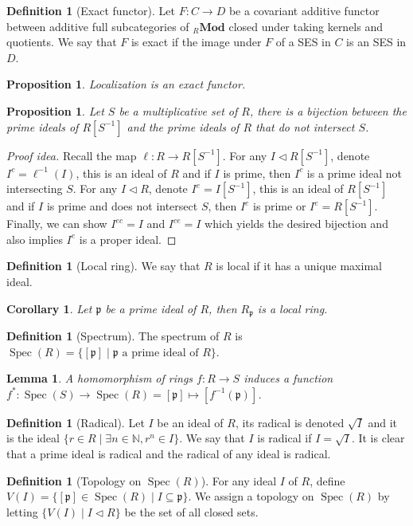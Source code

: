 \documentclass[paper=a4, fontsize=12pt]{scrartcl} %
\newtheorem{cor}[thm]{Corollary}
\newtheorem{prop}[thm]{Proposition}
\newtheorem{lem}[thm]{Lemma}
\theoremstyle{definition}
\newtheorem{defn}[thm]{Definition}
\theoremstyle{remark}
\newcommand{\N}{\mathbb{N}}
\newcommand{\lp}{{\mathfrak{p}}}
\DeclareMathOperator{\spec}{Spec}
\begin{document}
\begin{defn}[Exact functor]
	Let $F:C\rightarrow D$ be a covariant additive functor between additive full subcategories of ${}_R\textbf{Mod}$ closed under taking kernels and quotients. We say that $F$ is exact if the image under $F$ of a SES in $C$ is an SES in $D$.
\end{defn}
\begin{prop}
	Localization is an exact functor.
\end{prop}
\begin{prop}
	Let $S$ be a multiplicative set of $R$, there is a bijection between the prime ideals of $R[S^{-1}]$ and the prime ideals of $R$ that do not intersect $S$.
\end{prop}
\begin{proof}[Proof idea]
	Recall the map $\ell: R \rightarrow R[S^{-1}]$. For any $I \lhd R[S^{-1}]$, denote $I^c = \ell^{-1}(I)$, this is an ideal of $R$ and if $I$ is prime, then $I^c$ is a prime ideal not intersecting $S$. For any $I \lhd R$, denote $I^e = I[S^{-1}]$, this is an ideal of $R[S^{-1}]$ and if $I$ is prime and does not intersect $S$, then $I^e$ is prime or $I^e = R[S^{-1}]$. Finally, we can show $I^{ec} = I$ and $I^{ce} = I$ which yields the desired bijection and also implies $I^e$ is a proper ideal.
\end{proof}
\begin{defn}[Local ring]
	We say that $R$ is local if it has a unique maximal ideal.
\end{defn}
\begin{cor}
	Let $\lp$ be a prime ideal of $R$, then $R_{\lp}$ is a local ring.
\end{cor}
\begin{defn}[Spectrum]
	The spectrum of $R$ is $\spec(R) = \{[\lp] \mid \lp \text{ a prime ideal of } R\}$.
\end{defn}
\begin{lem}
	A homomorphism of rings $f:R\rightarrow S$ induces a function $f^{*}: \spec(S) \rightarrow \spec(R) = [\lp] \mapsto [f^{-1}(\lp)]$.
\end{lem}
\begin{defn}[Radical]
	Let $I$ be an ideal of $R$, its radical is denoted $\sqrt{I}$ and it is the ideal $\{r \in R \mid \exists n \in \N, r^n \in I\}$. We say that $I$ is radical if $I = \sqrt{I}$. It is clear that a prime ideal is radical and the radical of any ideal is radical.
\end{defn}
\begin{defn}[Topology on $\spec(R)$]
	For any ideal $I$ of $R$, define $V(I) = \{[\lp] \in \spec(R) \mid I \subseteq \lp\}$. We assign a topology on $\spec(R)$ by letting $\{V(I) \mid I \lhd R\}$ be the set of all closed sets.
\end{defn}
\end{document}
